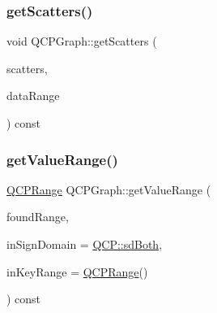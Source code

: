 \mbox{\label{class_q_c_p_graph_a9d7ba5904fdcaca413222335d4b283c3}} 
\subsubsection{\texorpdfstring{get\+Scatters()}{getScatters()}}
{\footnotesize\ttfamily void Q\+C\+P\+Graph\+::get\+Scatters (\begin{DoxyParamCaption}\item[{Q\+Vector$<$ Q\+PointF $>$ $\ast$}]{scatters,  }\item[{const \hyperlink{class_q_c_p_data_range}{Q\+C\+P\+Data\+Range} \&}]{data\+Range }\end{DoxyParamCaption}) const\hspace{0.3cm}{\ttfamily [protected]}}

\mbox{\label{class_q_c_p_graph_a8f773e56f191a61c06e129e90a604d77}} 
\subsubsection{\texorpdfstring{get\+Value\+Range()}{getValueRange()}}
{\footnotesize\ttfamily \hyperlink{class_q_c_p_range}{Q\+C\+P\+Range} Q\+C\+P\+Graph\+::get\+Value\+Range (\begin{DoxyParamCaption}\item[{bool \&}]{found\+Range,  }\item[{\hyperlink{namespace_q_c_p_afd50e7cf431af385614987d8553ff8a9}{Q\+C\+P\+::\+Sign\+Domain}}]{in\+Sign\+Domain = {\ttfamily \hyperlink{namespace_q_c_p_afd50e7cf431af385614987d8553ff8a9aa38352ef02d51ddfa4399d9551566e24}{Q\+C\+P\+::sd\+Both}},  }\item[{const \hyperlink{class_q_c_p_range}{Q\+C\+P\+Range} \&}]{in\+Key\+Range = {\ttfamily \hyperlink{class_q_c_p_range}{Q\+C\+P\+Range}()} }\end{DoxyParamCaption}) const\hspace{0.3cm}{\ttfamily [virtual]}}

